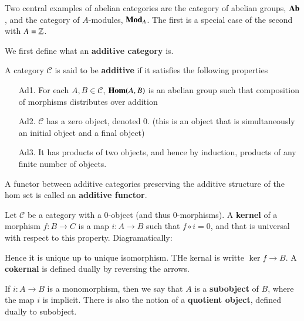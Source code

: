 Two central examples of abelian categories are the category of abelian groups, $\normalfont\textbf{Ab}$, and the category of $A$-modules, $\normalfont\textbf{Mod}_A$. The first is a special case of the second with $A  =\mathbb Z$. 

We first define what an \textbf{additive category} is.

\begin{definition}
    A category $\mathscr{C}$ is said to be \textbf{additive} if it satisfies the following properties\begin{itemize}
        \item[Ad1.] For each $A,B \in \mathscr{C}$, $\mathbf{Hom}(A,B)$ is an abelian group such that composition of morphisms distributes over addition 
        \item[Ad2.] $\mathscr{C}$ has a zero object, denoted $0$. (this is an object that is simultaneously an initial object and a final object)
        \item[Ad3.] It has products of two objects, and hence by induction, products of any finite number of objects.
    \end{itemize}
\end{definition}

A functor between additive categories preserving the additive structure of the hom set is called an \textbf{additive functor}.

\begin{definition}
    Let $\mathscr{C}$ be a category with a $0$-object (and thus $0$-morphisms). A \textbf{kernel} of a morphism $f:B\rightarrow C$ is a map $i:A\rightarrow B$ such that $f\circ i = 0$, and that is universal with respect to this property. Diagramatically: \begin{center}
    \end{center}
    Hence it is unique up to unique isomorphism. THe kernal is writte $\ker f\rightarrow B$. A \textbf{cokernal} is defined dually by reversing the arrows.
\end{definition}


If $i:A\rightarrow B$ is a monomorphism, then we say that $A$ is a \textbf{subobject} of $B$, where the map $i$ is implicit. There is also the notion of a \textbf{quotient object}, defined dually to subobject.

